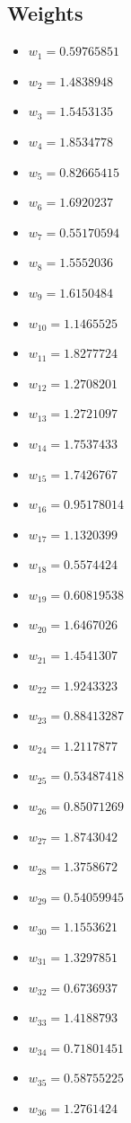 \documentclass[11pt]{article}
\begin{document}
\subsection*{Weights}
\begin{itemize}
\item $w_{1} = 0.59765851$
\item $w_{2} = 1.4838948$
\item $w_{3} = 1.5453135$
\item $w_{4} = 1.8534778$
\item $w_{5} = 0.82665415$
\item $w_{6} = 1.6920237$
\item $w_{7} = 0.55170594$
\item $w_{8} = 1.5552036$
\item $w_{9} = 1.6150484$
\item $w_{10} = 1.1465525$
\item $w_{11} = 1.8277724$
\item $w_{12} = 1.2708201$
\item $w_{13} = 1.2721097$
\item $w_{14} = 1.7537433$
\item $w_{15} = 1.7426767$
\item $w_{16} = 0.95178014$
\item $w_{17} = 1.1320399$
\item $w_{18} = 0.5574424$
\item $w_{19} = 0.60819538$
\item $w_{20} = 1.6467026$
\item $w_{21} = 1.4541307$
\item $w_{22} = 1.9243323$
\item $w_{23} = 0.88413287$
\item $w_{24} = 1.2117877$
\item $w_{25} = 0.53487418$
\item $w_{26} = 0.85071269$
\item $w_{27} = 1.8743042$
\item $w_{28} = 1.3758672$
\item $w_{29} = 0.54059945$
\item $w_{30} = 1.1553621$
\item $w_{31} = 1.3297851$
\item $w_{32} = 0.6736937$
\item $w_{33} = 1.4188793$
\item $w_{34} = 0.71801451$
\item $w_{35} = 0.58755225$
\item $w_{36} = 1.2761424$

\end{itemize}
\end{document}
